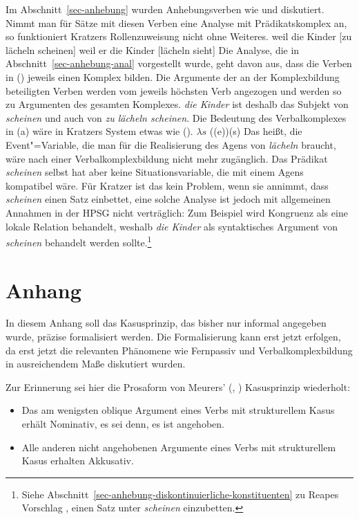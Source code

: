 {Im Abschnitt~\ref{sec-anhebung} wurden Anhebungsverben wie  und  diskutiert.
Nimmt man für Sätze mit diesen Verben eine Analyse mit Prädikatskomplex an, so funktioniert Kratzers
Rollenzuweisung nicht ohne Weiteres.
\eal
\ex weil die Kinder [zu lächeln scheinen]
\ex weil er die Kinder [lächeln sieht]
\zl
Die Analyse, die in Abschnitt~\ref{sec-anhebung-anal} vorgestellt wurde, geht davon aus, dass die Verben
in () jeweils einen Komplex bilden. Die Argumente der an der Komplexbildung beteiligten Verben
werden vom jeweils höchsten Verb angezogen und werden so zu Argumenten des gesamten Komplexes.
\emph{die Kinder} ist deshalb das Subjekt von \emph{scheinen} und auch von \emph{zu lächeln scheinen}. Die
Bedeutung des Verbalkomplexes in (a) wäre in Kratzers System etwas wie ().
\ea
$\lambda s$ ((e))(s)
\z
Das heißt, die Event"=Variable, die man für die Realisierung des Agens von \emph{lächeln} braucht, wäre
nach einer Verbalkomplexbildung nicht mehr zugänglich. Das Prädikat \emph{scheinen} selbst
hat aber keine Situationsvariable, die mit einem Agens kompatibel wäre.
Für Kratzer ist das kein Problem, wenn sie annimmt, dass \emph{scheinen} einen Satz einbettet, 
eine solche Analyse ist jedoch mit allgemeinen Annahmen in der HPSG nicht verträglich: 
Zum Beispiel wird Kongruenz als eine lokale Relation behandelt, weshalb
\emph{die Kinder} als syntaktisches Argument von \emph{scheinen} behandelt werden sollte.\footnote{
  Siehe Abschnitt~\ref{sec-anhebung-diskontinuierliche-konstituenten}
zu Reapes Vorschlag \citeyearpar{Reape94a},
  einen Satz unter \emph{scheinen} einzubetten.%
}

\section{Anhang}
\label{kasus-anhang}
\label{sec-realized}

In diesem Anhang soll das Kasusprinzip, das bisher nur informal angegeben wurde,
präzise formalisiert werden. Die Formalisierung kann erst jetzt erfolgen, da erst jetzt die
relevanten Phänomene wie Fernpassiv und Verbalkomplexbildung in ausreichendem
Maße diskutiert wurden.

Zur Erinnerung sei hier die Prosaform von
Meurers' (\citeyear{Meurers99b}, \citeyear[Abschnitt~10.4.1.4]{Meurers2000b})
Kasusprinzip wiederholt:

\begin{itemize}
\item[a.] Das am wenigsten oblique Argument eines Verbs mit strukturellem Kasus erhält Nominativ,
          es sei denn, es ist angehoben.
\item[b.] Alle anderen nicht angehobenen Argumente eines Verbs mit strukturellem Kasus erhalten Akkusativ.
\end{itemize}

}
